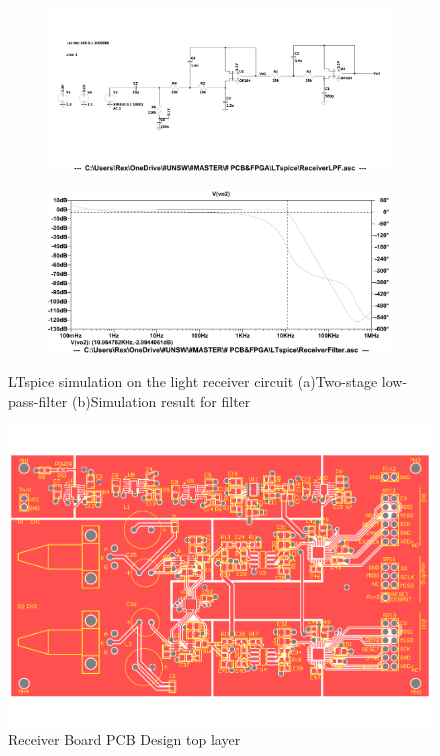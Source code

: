 \begin{figure}
\centering
\begin{subfigure}{1\textwidth}
  \centering
  \includegraphics[width=1\linewidth]{4-ANC_Sys/LTspiceLPFSch.pdf}
  \caption{}
  \label{fig_LTspiceLPFSch}
\end{subfigure}
\begin{subfigure}{1\textwidth}
  \centering
  \includegraphics[width=1\linewidth]{4-ANC_Sys/LTspiceLPF.pdf}
  \caption{}
  \label{fig_LTspiceLPF}
\end{subfigure}
\caption{LTspice simulation on the light receiver circuit (a)Two-stage low-pass-filter (b)Simulation result for filter}
\label{fig_LTspiceSim2}
\end{figure}

\begin{figure}[H]
\centering
\includegraphics[width=0.9\linewidth]{4-ANC_Sys/PCB.pdf}
\caption{Receiver Board PCB Design top layer}
\label{fig_PCB}
\end{figure}

